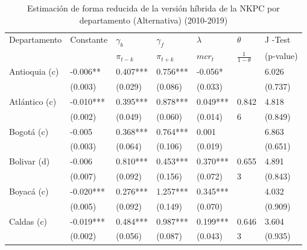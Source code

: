 \begin{table}%
\centering
\caption{Estimación de forma reducida de la versión híbrida de la NKPC por departamento (Alternativa) (2010-2019)}
\begin{tabular}{lllllll}
\hline
\hline
Departamento & Constante  & $\gamma_{b}$  & $\gamma_{f}$ & $\lambda$   & $\theta$ & J -Test \\
 &       &   $\pi_{t-k}$    &    $\pi_{t+k}$    &  $mcr_{t}$    &   $\frac{1}{1-\theta}$    & (p-value) \\
\hline
\vspace{-0.3cm} Antioquia (c)  & -0.006** & 0.407*** & 0.756*** & -0.056* &       & 6.026\\   
& \scriptsize{(0.003)} & \scriptsize{(0.029)} & \scriptsize{(0.086)} & \scriptsize{(0.033)} &       & \scriptsize{(0.737)} \\
\vspace{-0.3cm} Atlántico (c) & -0.010*** & 0.395*** & 0.878*** & 0.049*** & 0.842 & 4.818\\   
& \scriptsize{(0.002)} & \scriptsize{(0.049)} & \scriptsize{(0.060)} & \scriptsize{(0.014)} & \scriptsize{6}    & \scriptsize{(0.849)} \\
\vspace{-0.3cm} Bogotá (c) & -0.005 & 0.368*** & 0.764*** & 0.001 &       & 6.863\\   
& \scriptsize{(0.003)} & \scriptsize{(0.064)} & \scriptsize{(0.106)} & \scriptsize{(0.019)} &       & \scriptsize{(0.651)} \\
\vspace{-0.3cm} Bolivar (d) & -0.006 & 0.810*** & 0.453*** & 0.370*** & 0.655 & 4.891\\   
& \scriptsize{(0.007)} & \scriptsize{(0.092)} & \scriptsize{(0.156)} & \scriptsize{(0.072)} & \scriptsize{3}     & \scriptsize{(0.843)} \\
\vspace{-0.3cm} Boyacá (c) & -0.020*** & 0.276*** & 1.257*** & 0.345*** &       & 4.032\\   
& \scriptsize{(0.005)} & \scriptsize{(0.092)} & \scriptsize{(0.149)} & \scriptsize{(0.070)} &       & \scriptsize{(0.909)} \\
\vspace{-0.3cm} Caldas (c) & -0.019*** & 0.484*** & 0.987*** & 0.199*** & 0.646 & 3.604\\   
& \scriptsize{(0.002)} & \scriptsize{(0.056)} & \scriptsize{(0.087)} & \scriptsize{(0.043)} & \scriptsize{3}     & \scriptsize{(0.935)} \\

\end{tabular}
\end{table}
